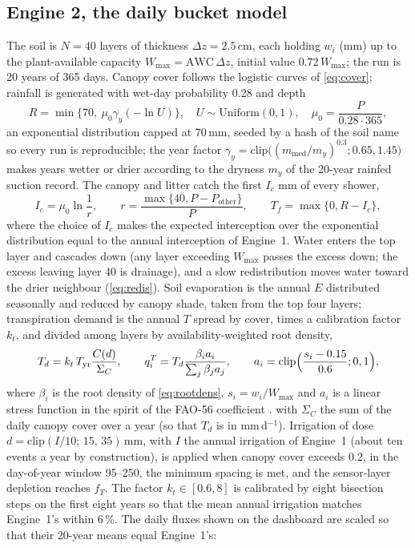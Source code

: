 \subsection{Engine 2, the daily bucket model}
The soil is $N=40$ layers of thickness $\Delta z=2.5$\,cm, each holding $w_i$ (mm) up to the plant-available capacity $W_{\max}=\mathrm{AWC}\,\Delta z$, initial value $0.72\,W_{\max}$; the run is 20 years of 365 days. Canopy cover follows the logistic curves of \cref{eq:cover}; rainfall is generated with wet-day probability 0.28 and depth
\begin{equation}
R=\min\{70,\ \mu_0\gamma_y(-\ln U)\},\quad U\sim\mathrm{Uniform}(0,1),\quad \mu_0=\frac{P}{0.28\cdot365},
\label{eq:rain}
\end{equation}
an exponential distribution capped at 70\,mm, seeded by a hash of the soil name so every run is reproducible; the year factor $\gamma_y=\mathrm{clip}\bigl((m_{\mathrm{med}}/m_y)^{0.3};0.65,1.45\bigr)$ makes years wetter or drier according to the dryness $m_y$ of the 20-year rainfed suction record. The canopy and litter catch the first $I_c$ mm of every shower,
\begin{equation}
I_c=\mu_0\ln\frac1r,\qquad r=\frac{\max\{40,P-P_{\mathrm{other}}\}}{P},\qquad T_f=\max\{0,R-I_c\},
\label{eq:interc}
\end{equation}
where the choice of $I_c$ makes the expected interception over the exponential distribution equal to the annual interception of Engine~1. Water enters the top layer and cascades down (any layer exceeding $W_{\max}$ passes the excess down; the excess leaving layer 40 is drainage), and a slow redistribution moves water toward the drier neighbour (\cref{eq:redis}). Soil evaporation is the annual $E$ distributed seasonally and reduced by canopy shade, taken from the top four layers; transpiration demand is the annual $T$ spread by cover, times a calibration factor $k_t$, and divided among layers by availability-weighted root density,
\begin{equation}
T_d=k_t\,T_{\mathrm{yr}}\frac{C(d)}{\Sigma_C},\qquad q_i^{T}=T_d\frac{\beta_i a_i}{\sum_j\beta_ja_j},\qquad a_i=\mathrm{clip}\Bigl(\frac{s_i-0.15}{0.6};0,1\Bigr),
\label{eq:transp}
\end{equation}
where $\beta_i$ is the root density of \cref{eq:rootdens}, $s_i=w_i/W_{\max}$ and $a_i$ is a linear stress function in the spirit of the FAO-56 coefficient \citep{Allen1998}. with $\Sigma_C$ the sum of the daily canopy cover over a year (so that $T_d$ is in mm\,d$^{-1}$). Irrigation of dose $d=\mathrm{clip}(I/10;\,15,\,35)$\,mm, with $I$ the annual irrigation of Engine~1 (about ten events a year by construction), is applied when canopy cover exceeds 0.2, in the day-of-year window 95--250, the minimum spacing is met, and the sensor-layer depletion reaches $f_T$. The factor $k_t\in[0.6,8]$ is calibrated by eight bisection steps on the first eight years so that the mean annual irrigation matches Engine~1's within 6\,\%. The daily fluxes shown on the dashboard are scaled so that their 20-year means equal Engine~1's:
